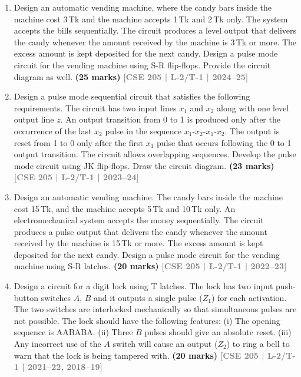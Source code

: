\documentclass[12pt]{article}
\newcommand{\yr}[1]{\hfill\textcolor{gray}{\small\textbf{[#1]}}}
\newcommand{\mk}[1]{\textcolor{orange!70!black}{\small\textbf{(#1 marks)}}}
\begin{document}
\begin{enumerate}

\item Design an automatic vending machine, where the candy bars inside the machine cost 3\,Tk and the machine accepts 1\,Tk and 2\,Tk only. The system accepts the bills sequentially. The circuit produces a level output that delivers the candy whenever the amount received by the machine is 3\,Tk or more. The excess amount is kept deposited for the next candy. Design a pulse mode circuit for the vending machine using S-R flip-flops. Provide the circuit diagram as well.
\mk{25} \yr{CSE 205 | L-2/T-1 | 2024--25}



\item Design a pulse mode sequential circuit that satisfies the following requirements. The circuit has two input lines $x_1$ and $x_2$ along with one level output line $z$. An output transition from 0 to 1 is produced only after the occurrence of the last $x_2$ pulse in the sequence $x_1\text{-}x_2\text{-}x_1\text{-}x_2$. The output is reset from 1 to 0 only after the first $x_1$ pulse that occurs following the 0 to 1 output transition. The circuit allows overlapping sequences. Develop the pulse mode circuit using JK flip-flops. Draw the circuit diagram.
\mk{23} \yr{CSE 205 | L-2/T-1 | 2023--24}



\item Design an automatic vending machine. The candy bars inside the machine cost 15\,Tk, and the machine accepts 5\,Tk and 10\,Tk only. An electromechanical system accepts the money sequentially. The circuit produces a pulse output that delivers the candy whenever the amount received by the machine is 15\,Tk or more. The excess amount is kept deposited for the next candy. Design a pulse mode circuit for the vending machine using S-R latches.
\mk{20} \yr{CSE 205 | L-2/T-1 | 2022--23}



\item Design a circuit for a digit lock using T latches. The lock has two input push-button switches $A$, $B$ and it outputs a single pulse ($Z_1$) for each activation. The two switches are interlocked mechanically so that simultaneous pulses are not possible. The lock should have the following features: (i) The opening sequence is AABABA. (ii) Three $B$ pulses should give an absolute reset. (iii) Any incorrect use of the $A$ switch will cause an output ($Z_2$) to ring a bell to warn that the lock is being tampered with.
\mk{20} \yr{CSE 205 | L-2/T-1 | 2021--22, 2018--19}




\end{enumerate}
\end{document}

